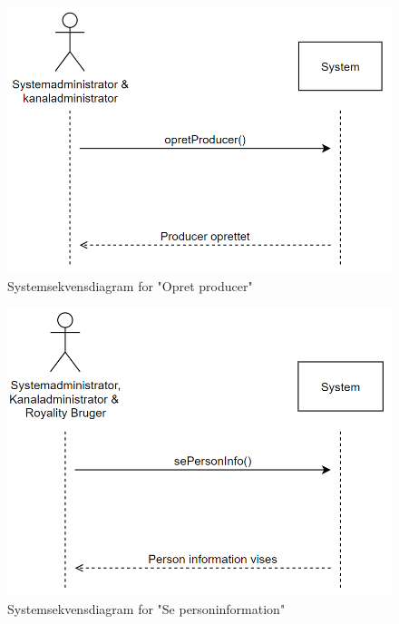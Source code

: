 \begin{figure}[H]
\centering
\includegraphics[scale=0.43]{figures/systemsekvensdiagrammer/opretProducer.PNG}
\caption{Systemsekvensdiagram for "Opret producer"}
\label{fig:create_producer}
\end{figure}

\begin{figure}[H]
\centering
\includegraphics[scale=0.43]{figures/systemsekvensdiagrammer/sePersonInfo.PNG}
\caption{Systemsekvensdiagram for "Se personinformation"}
\label{fig:read_person_info}
\end{figure}